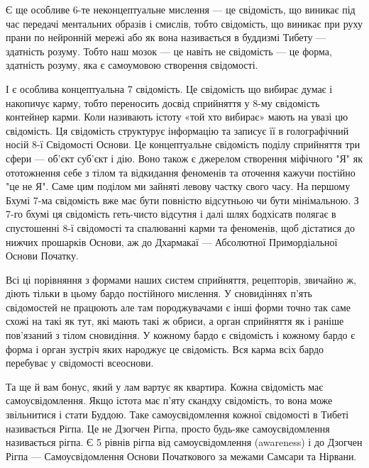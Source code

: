 Є ще особливе 6-те неконцептуальне мислення --- це свідомість, що виникає під
час передачі ментальних образів і смислів, тобто свідомість, що виникає при руху
прани по нейронній мережі або як вона називається в буддизмі Тибету ---
здатність розуму. Тобто наш мозок --- це навіть не свідомість ---
це форма, здатність розуму, яка є самоумовою створення свідомості.

І є особлива концептуальна 7 свідомість. Це свідомість що вибирає думає і
накопичує карму, тобто переносить досвід сприйняття у 8-му свідомість контейнер карми.
Коли називають істоту «той хто вибирає» мають на увазі цю свідомість.
Ця свідомість структурує інформацію та записує її в голографічний носій 8-ї
Свідомості Основи. Це концептуальне свідомість поділу сприйняття три сфери ---
об'єкт суб'єкт і дію. Воно також є джерелом створення міфічного "Я" як ототожнення
себе з тілом та відкидання феноменів та оточення кажучи постійно "це не Я". Саме
цим поділом ми зайняті левову частку свого часу. На першому Бхумі 7-ма свідомість
вже має бути повністю відсутньою чи бути мінімальною. З 7-го бхумі ця свідомість
геть-чисто відсутня і далі шлях бодхісатв полягає в спустошенні 8-ї свідомості
та спалюванні карми та феноменів, щоб дістатися до нижчих прошарків Основи,
аж до Дхармакаї --- Абсолютної Примордіальної Основи Початку.

Всі ці порівняння з формами наших систем сприйняття, рецепторів, звичайно ж,
діють тільки в цьому бардо постійного мислення. У сновидіннях п'ять свідомостей
не працюють але там породжувачами є інші форми точно так саме схожі на такі як тут,
які мають такі ж обриси, а орган сприйняття як і раніше пов'язаний з тілом сновидіння.
У кожному бардо є свідомість і кожному бардо є форма і орган зустріч яких
народжує це свідомість. Вся карма всіх бардо перебуває у свідомості всеоснови.

Та ще й вам бонус, який у лам вартує як квартира. Кожна свідомість має самоусвідомлення.
Якщо істота має п'яту скандху свідомість, то вона може звільнитися і стати Буддою.
Таке самоусвідомлення кожної свідомості в Тибеті називається Рігпа. Це не
Дзогчен Рігпа, просто будь-яке самоусвідомлення називається рігпа.
Є 5 рівнів рігпа від самоусвідомлення (awareness) і до Дзогчен Рігпа ---
Самоусвідомлення Основи Початкового за межами Самсари та Нірвани.
